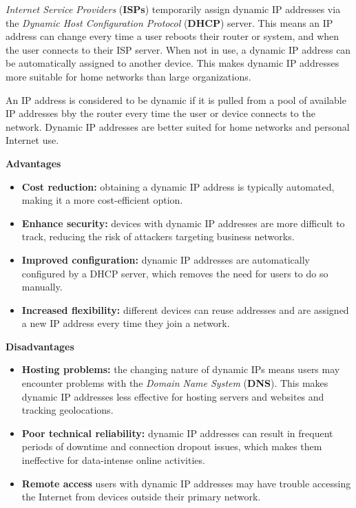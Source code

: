 \textit{Internet Service Providers} (\textbf{ISPs}) temporarily assign dynamic IP addresses via the \textit{Dynamic Host Configuration Protocol} (\textbf{DHCP}) server. This means an IP address can change every time a user reboots their router or system, and when the user connects to their ISP server. When not in use, a dynamic IP address can be automatically assigned to another device. This makes dynamic IP addresses more suitable for home networks than large organizations.

An IP address is considered to be dynamic if it is pulled from a pool of available IP addresses bby the router every time the user or device connects to the network. Dynamic IP addresses are better suited for home networks and personal Internet use.

\textbf{Advantages}

\begin{itemize}
  \item \textbf{Cost reduction:} obtaining a dynamic IP address is typically automated, making it a more cost-efficient option.
  \item \textbf{Enhance security:} devices with dynamic IP addresses are more difficult to track, reducing the risk of attackers targeting business networks.
  \item \textbf{Improved configuration:} dynamic IP addresses are automatically configured by a DHCP server, which removes the need for users to do so manually.
  \item \textbf{Increased flexibility:} different devices can reuse addresses and are assigned a new IP address every time they join a network.
\end{itemize}

\textbf{Disadvantages}

\begin{itemize}
  \item \textbf{Hosting problems:} the changing nature of dynamic IPs means users may encounter problems with the \textit{Domain Name System} (\textbf{DNS}). This makes dynamic IP addresses less effective for hosting servers and websites and tracking geolocations.
  \item \textbf{Poor technical reliability:} dynamic IP addresses can result in frequent periods of downtime and connection dropout issues, which makes them ineffective for data-intense online activities.
  \item \textbf{Remote access} users with dynamic IP addresses may have trouble accessing the Internet from devices outside their primary network.
\end{itemize}
